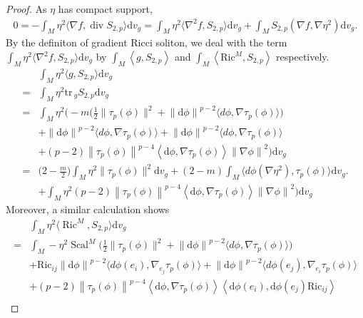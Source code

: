 \documentclass[12pt,UTF8]{article}
\theoremstyle{plain}
\theoremstyle{definition}
\def\d {\mathrm{d}}
\def\Ric {\mathrm{Ric}}
\def\na{\ensuremath{\nabla}}
\renewcommand{\d}[1]{\mathbb{#1}}
\renewcommand{\(}{\left(}
\renewcommand{\)}{\right)}
\DeclareMathOperator{\tr}{tr}
\newcommand{\norm}[1]{\left\lVert#1\right\rVert}%
\def\Ric{\mathrm{Ric\, }}
\def\tr{\mathrm{tr\, }}
\numberwithin{equation}{subsection}
\def\na{\nabla}
\newcommand{\dv}{\operatorname{div}}
\newcommand{\tr}{\mbox{tr}}
\renewcommand{\(}{\left(}
\renewcommand{\)}{\right)}
\def\d{\mathrm{d}}
\def \d {\mathrm{d}}
\def \Ric {\mathrm{Ric}}
\def\dv{\d v_g}
\numberwithin{equation}{section}
\begin{document}
\begin{proof}
	As $\eta$ has compact support,
\begin{equation}\label{9}
	\begin{split}
			0=-\int_M\eta^2\langle\nabla f,\operatorname{div} S_{2,p}\rangle \dv
		=\int_M\eta^2\langle\nabla^2f,S_{2,p}\rangle \dv
		+\int_M S_{2,p}(\nabla f,\nabla\eta^2) \dv.
	\end{split}
\end{equation}
By the definiton of gradient Ricci soliton,  we deal with the  term $\int_M\eta^2\langle\nabla^2f,S_{2,p}\rangle \dv$
  by $\int_M \left\langle g,S_{2,p} \right\rangle$ and  $\int_M \left\langle \Ric^M,S_{2,p} \right\rangle$  respectively.
\begin{equation}\label{10}
	\begin{split}
		&\int_M\eta^2\langle g,S_{2,p}\rangle \dv\\
		=&\int_M\eta^2\tr_gS_{2,p} \dv \\
		=&\int_M\eta^2\bigg(-m\big(\frac{1}{2}\|\tau_p(\phi)\|^{2}+\norm{\d \phi}^{p-2}\langle d\phi,\na\tau_p(\phi)\rangle\big)\\
		&+\norm{\d \phi}^{p-2}\langle d\phi,\na\tau_p(\phi)\rangle+\norm{\d \phi}^{p-2}\langle d\phi,\na\tau_p(\phi)\rangle\\
		&+(p-2)\norm{\tau_p(\phi)}^{p-4}\left\langle \d \phi,\na \tau_p(\phi) \right\rangle\norm{\na \phi}^2\bigg) \dv\\
		=&\big(2-\frac{m}{2}\big)\int_M\eta^2\|\tau_p(\phi)\|^2 \dv
		+(2-m)\int_M\langle d\phi(\nabla\eta^2),\tau_p(\phi)\rangle \dv.\\
		&+\int_M \eta^2(p-2)\norm{\tau_p(\phi)}^{p-4}\left\langle \d \phi,\na \tau_p(\phi) \right\rangle\norm{\na \phi}^2\bigg) \dv
	\end{split}
\end{equation}
	Moreover, a similar calculation shows
\begin{equation}\label{11}
	\begin{split}
		&\int_M\eta^2\langle\operatorname{Ric}^M,S_{2,p}\rangle \dv\\
		=&\int_M-\eta^2\operatorname{Scal}^M \big(\frac{1}{2}\|\tau_p(\phi)\|^{2}+\norm{\d \phi}^{p-2}\langle d\phi,\na\tau_p(\phi)\rangle\big)\\
		&+\Ric_{ij}\norm{\d \phi}^{p-2}\langle d\phi(e_i),\na_{e_j}\tau_p(\phi)\rangle+\norm{\d \phi}^{p-2}\langle d\phi(e_j),\na_{e_i}\tau_p(\phi)\rangle\\
		&+(p-2)\norm{\tau_p(\phi)}^{p-4}\left\langle \d \phi,\na \tau_p(\phi) \right\rangle\left\langle \d \phi(e_i),\d \phi(e_j)\Ric_{ij} \right\rangle\\

\end{split}
\end{equation}
\end{proof}
\end{document}
